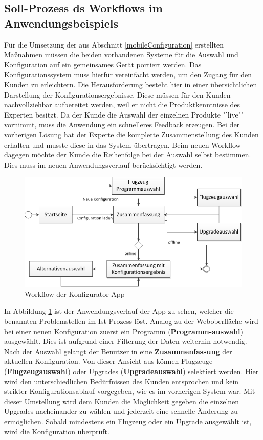 \subsection{Soll-Prozess ds Workflows im Anwendungsbeispiels}\label{workflowNew}
Für die Umsetzung der aus Abschnitt \ref{mobileConfiguration} erstellten Maßnahmen müssen die beiden vorhandenen Systeme für die Auswahl und Konfiguration auf ein gemeinsames Gerät portiert werden. Das Konfigurationssystem muss hierfür vereinfacht werden, um den Zugang für den Kunden zu erleichtern. Die Herausforderung besteht hier in einer übersichtlichen Darstellung der Konfigurationsergebnisse. Diese müssen für den Kunden nachvollziehbar aufbereitet werden, weil er nicht die Produktkenntnisse des Experten besitzt. Da der Kunde die Auswahl der einzelnen Produkte "'live"' vornimmt, muss die Anwendung ein schnelleres Feedback erzeugen. Bei der vorherigen Lösung hat der Experte die komplette Zusammenstellung des Kunden erhalten und musste diese in das System übertragen. Beim neuen Workflow dagegen möchte der Kunde die Reihenfolge bei der Auswahl selbst bestimmen. Dies muss im neuen Anwendungsverlauf berücksichtigt werden. \par 
\begin{figure}
\centering
\includegraphics[width=\hsize]{images/workflow_app}
\caption{Workflow der Konfigurator-App}
\label{appWorkflow}
\end{figure}
In Abbildung \ref{appWorkflow} ist der Anwendungsverlauf der App zu sehen, welcher die benannten Problemstellen im Ist-Prozess löst. Analog zu der Weboberfläche wird bei einer neuen Konfiguration zuerst ein Programm (\textbf{Programm-auswahl}) ausgewählt. Dies ist aufgrund einer Filterung der Daten weiterhin notwendig. Nach der Auswahl gelangt der Benutzer in eine \textbf{Zusammenfassung} der aktuellen Konfiguration. Von dieser Ansicht aus können Flugzeuge (\textbf{Flugzeugauswahl}) oder  Upgrades (\textbf{Upgradeauswahl}) selektiert werden. Hier wird den unterschiedlichen Bedürfnissen des Kunden entsprochen und kein strikter Konfigurationsablauf vorgegeben, wie es im vorherigen System war. Mit dieser Umstellung wird dem Kunden die Möglichkeit gegeben die einzelnen Upgrades nacheinander zu wählen und jederzeit eine schnelle Änderung zu ermöglichen. Sobald mindestens ein Flugzeug oder ein Upgrade ausgewählt ist, wird die Konfiguration überprüft. 
